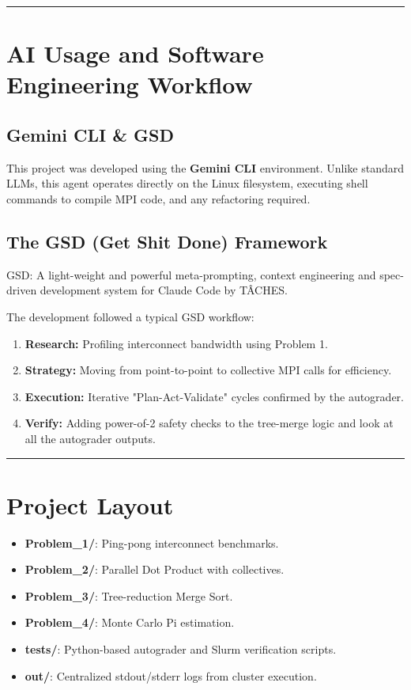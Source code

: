 \documentclass[11pt]{article}
\begin{document}
\noindent\rule{\textwidth}{0.4pt}

\section*{\color{white}AI Usage and Software Engineering Workflow}

\subsection*{Gemini CLI \& GSD }
This project was developed using the \textbf{Gemini CLI} environment. Unlike standard LLMs, this agent operates directly on the Linux filesystem, executing shell commands to compile MPI code, and any refactoring required.

\subsection*{The GSD (Get Shit Done) Framework}
GSD: A light-weight and powerful meta-prompting, context engineering and spec-driven development system for Claude Code by TÂCHES.

The development followed a typical GSD workflow:
\begin{enumerate}[label=\alph*.]
    \item \textbf{Research:} Profiling interconnect bandwidth using Problem 1.
    \item \textbf{Strategy:} Moving from point-to-point to collective MPI calls for efficiency.
    \item \textbf{Execution:} Iterative "Plan-Act-Validate" cycles confirmed by the autograder.
    \item \textbf{Verify:} Adding power-of-2 safety checks to the tree-merge logic and look at all the autograder outputs.
\end{enumerate}

\noindent\rule{\textwidth}{0.4pt}

\section*{\color{white}Project Layout}
\begin{itemize}
    \item \textbf{Problem\_1/}: Ping-pong interconnect benchmarks.
    \item \textbf{Problem\_2/}: Parallel Dot Product with collectives.
    \item \textbf{Problem\_3/}: Tree-reduction Merge Sort.
    \item \textbf{Problem\_4/}: Monte Carlo Pi estimation.
    \item \textbf{tests/}: Python-based autograder and Slurm verification scripts.
    \item \textbf{out/}: Centralized stdout/stderr logs from cluster execution.
\end{itemize}
\end{document}
